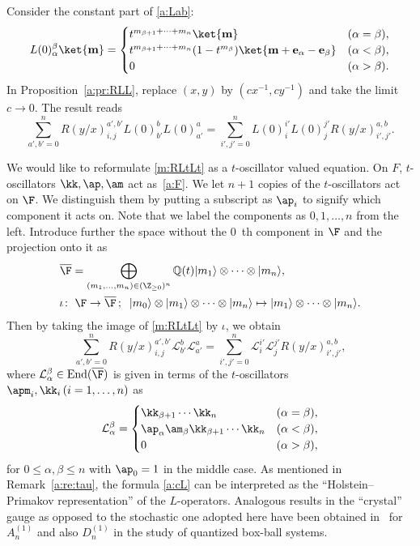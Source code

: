 Consider the constant part of \eqref{a:Lab}:
\begin{equation} \label{m:Lt}
L(0)_\alpha^\beta \ket{{\bf m}} = \begin{cases}
t^{m_{\beta+1}+\cdots+m_n}\ket{{\bf m}}&(\alpha=\beta),\\
t^{m_{\beta+1}+\cdots+m_n}(1-t^{m_\beta}) \ket{{\bf m}+{\bf e}_\alpha-{\bf e}_\beta} &(\alpha<\beta),\\
0&(\alpha>\beta).
\end{cases}
\end{equation}
%
In Proposition~\ref{a:pr:RLL}, replace $(x,y)$ by $(cx^{-1},cy^{-1})$ and take the limit $c\rightarrow 0$.
The result reads
\begin{equation} \label{m:RLtLt}
\sum_{a',b'=0}^nR(y/x)_{i, j}^{a', b'}L(0)_{b'}^bL(0)_{a'}^a
=\sum_{i',j'=0}^nL(0)_i^{i'}L(0)_j^{j'}R(y/x)_{i', j'}^{a, b}.
\end{equation}

We would like to reformulate \eqref{m:RLtLt} as a $t$-oscillator valued equation. 
On $F$, $t$-oscillators $\kk,\ap,\am$ act as~\eqref{a:F}.
We let $n+1$ copies of the $t$-oscillators act on $\F$. 
We distinguish them by putting a subscript
as $\ap_i$ to signify which component it acts on. Note that we label the components as
$0,1,\ldots,n$ from the left. 
%
Introduce further the space without the $0$~th component in $\F$ and the projection onto it as 
\begin{align}
\overline{\F} &= \bigoplus_{(m_1,\ldots, m_n) \in (\Z_{\ge 0})^n}
\mathbb{Q}(t) |m_1\rangle \otimes \cdots \otimes |m_n\rangle,
\\
\iota \colon & \;  \F \rightarrow \overline{\F}\,;\;\;  
|m_0\rangle \otimes |m_1\rangle \otimes \cdots \otimes |m_n\rangle  
\mapsto  |m_1\rangle \otimes \cdots \otimes |m_n\rangle.
\end{align}
Then by taking the image of \eqref{m:RLtLt} by $\iota$, we obtain
\begin{equation} \label{a:nr}
\sum_{a',b'=0}^nR(y/x)_{i, j}^{a', b'}\mathcal{L}_{b'}^b\mathcal{L}_{a'}^a
=\sum_{i',j'=0}^n\mathcal{L}_i^{i'}\mathcal{L}_j^{j'}R(y/x)_{i', j'}^{a, b},
\end{equation}
where $\mathcal{L}_\alpha^\beta \in \mathrm{End}(\overline{\F})$ is given 
in terms of the $t$-oscillators $\apm_i,\kk_i \, (i=1,\ldots, n)$ as
\begin{equation}\label{a:cL}
\mathcal{L}_\alpha^\beta= \begin{cases}
\kk_{\beta+1}\cdots\kk_n&(\alpha=\beta),\\
\ap_\alpha\am_\beta\kk_{\beta+1}\cdots\kk_n&(\alpha<\beta),\\
0&(\alpha>\beta),
\end{cases}
\end{equation}
for  $0 \le \alpha, \beta \le n$ with $\ap_0=1$ in the middle case.
%
As mentioned in Remark~\ref{a:re:tau}, 
the formula \eqref{a:cL} can be interpreted as  the ``Holstein--Primakov representation'' of the $L$-operators. 
Analogous results in the ``crystal'' gauge as opposed to the stochastic one adopted here 
have been obtained in~\cite{IKO} for $A^{(1)}_n$ and also $D^{(1)}_n$
in the study of quantized box-ball systems.

